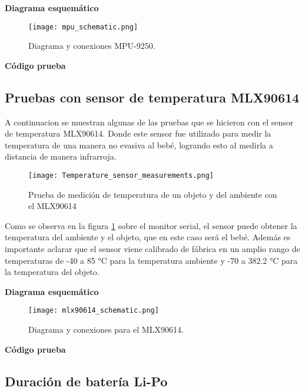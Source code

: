 \textbf{Diagrama esquemático}
\begin{figure}[htp!]
    \centering
    \texttt{[image: mpu\_schematic.png]}
    \caption{Diagrama y conexiones MPU-9250.}
\end{figure}
\FloatBarrier
\textbf{Código prueba}

\lstset{style=mystyle}



\subsection{Pruebas con sensor de temperatura MLX90614}

A continuacion se muestran algunas de las pruebas que se hicieron con el sensor de temperatura MLX90614.
Donde este sensor fue utilizado para medir la temperatura de una manera no evasiva al bebé, logrando esto
al medirla a distancia de manera infrarroja.

\begin{figure}[htp!]
    \centering
    \texttt{[image: Temperature\_sensor\_measurements.png]}
    \caption{Prueba de medición de temperatura de un objeto y del ambiente con el MLX90614}
    \label{fig: temperature_measurements}
\end{figure}
\FloatBarrier

Como se observa en la figura \ref{fig: temperature_measurements} sobre el monitor serial, el sensor puede obtener la temperatura del
ambiente y el objeto, que en este caso será el bebé. Además es importante aclarar que el sensor viene calibrado de fábrica en un amplio rango de temperaturas de
-40 a 85 °C para la temperatura ambiente y -70 a 382.2 °C para la temperatura del objeto.\newline

\textbf{Diagrama esquemático}
\begin{figure}[htp!]
    \centering
    \texttt{[image: mlx90614\_schematic.png]}
    \caption{Diagrama y conexiones para el MLX90614.}
\end{figure}
\FloatBarrier
\textbf{Código prueba}

\lstset{style=mystyle}



\subsection{Duración de batería Li-Po}

